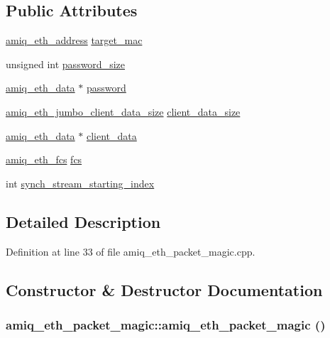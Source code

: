 \subsection*{Public Attributes}
\begin{DoxyCompactItemize}
\item 
\hyperlink{amiq__eth__types_8cpp_a76a5a0c4430f7bd4f0773ac89fcc104a}{amiq\_\-eth\_\-address} \hyperlink{classamiq__eth__packet__magic_a637e45b53f846df836bf9cc3ac3dfcd6}{target\_\-mac}
\item 
unsigned int \hyperlink{classamiq__eth__packet__magic_a9886d0fb22aecb6ff6223bc527391a46}{password\_\-size}
\item 
\hyperlink{amiq__eth__types_8cpp_a3595a0a508d433d383d3e5521fc0b723}{amiq\_\-eth\_\-data} $\ast$ \hyperlink{classamiq__eth__packet__magic_a42adfe3e292a6b67e466ded58dfa7d1c}{password}
\item 
\hyperlink{amiq__eth__types_8cpp_a91e895e78bf9f23c2cab9db2fb280e8b}{amiq\_\-eth\_\-jumbo\_\-client\_\-data\_\-size} \hyperlink{classamiq__eth__packet__magic_abc186b414e871bb0b06544bfb4bea774}{client\_\-data\_\-size}
\item 
\hyperlink{amiq__eth__types_8cpp_a3595a0a508d433d383d3e5521fc0b723}{amiq\_\-eth\_\-data} $\ast$ \hyperlink{classamiq__eth__packet__magic_a1f725ceba2f857032fbae819b7af409f}{client\_\-data}
\item 
\hyperlink{amiq__eth__types_8cpp_adb511dc715b55539c6abdad1de981a9f}{amiq\_\-eth\_\-fcs} \hyperlink{classamiq__eth__packet__magic_af8870f1b03256d0bed2dedc39a74d0f5}{fcs}
\item 
int \hyperlink{classamiq__eth__packet__magic_adf2528cb7352ff0a1876232483803a4f}{synch\_\-stream\_\-starting\_\-index}
\end{DoxyCompactItemize}


\subsection{Detailed Description}


Definition at line 33 of file amiq\_\-eth\_\-packet\_\-magic.cpp.

\subsection{Constructor \& Destructor Documentation}
\hypertarget{classamiq__eth__packet__magic_ad980d72550a76056113b94a6e2105123}{
\subsubsection[{amiq\_\-eth\_\-packet\_\-magic}]{\setlength{\rightskip}{0pt plus 5cm}amiq\_\-eth\_\-packet\_\-magic::amiq\_\-eth\_\-packet\_\-magic ()}}
\label{classamiq__eth__packet__magic_ad980d72550a76056113b94a6e2105123}


